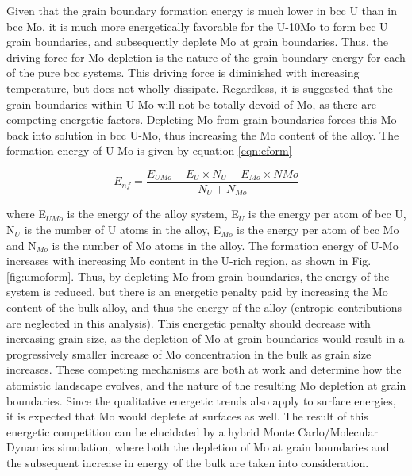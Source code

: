 \documentclass[review]{elsarticle}
\begin{document}
Given that the grain boundary formation energy is much lower in bcc U than in bcc Mo, it is much more energetically favorable for the U-10Mo to form bcc U grain boundaries, and subsequently deplete Mo at grain boundaries. Thus, the driving force for Mo depletion is the nature of the grain boundary energy for each of the pure bcc systems. This driving force is diminished with increasing temperature, but does not wholly dissipate. Regardless, it is suggested that the grain boundaries within U-Mo will not be totally devoid of Mo, as there are competing energetic factors. Depleting Mo from grain boundaries forces this Mo back into solution in bcc U-Mo, thus increasing the Mo content of the alloy. The formation energy of U-Mo is given by equation \ref{eqn:eform}

\begin{equation}
\label{eqn:eform}
E_{nf}= \frac{ E_{UMo} - E_{U} \times N_{U} - E_{Mo} \times N{Mo} }{ N_{U} + N_{Mo} }
\end{equation}

where E$_{UMo}$ is the energy of the alloy system, E$_{U}$ is the energy per atom of bcc U, N$_{U}$ is the number of U atoms in the alloy, E$_{Mo}$ is the energy per atom of bcc Mo and N$_{Mo}$ is the number of Mo atoms in the alloy. The formation energy of U-Mo increases with increasing Mo content in the U-rich region, as shown in Fig. \ref{fig:umoform}. Thus, by depleting Mo from grain boundaries, the energy of the system is reduced, but there is an energetic penalty paid by increasing the Mo content of the bulk alloy, and thus the energy of the alloy (entropic contributions are neglected in this analysis). This energetic penalty should decrease with increasing grain size, as the depletion of Mo at grain boundaries would result in a progressively smaller increase of Mo concentration in the bulk as grain size increases. These competing mechanisms are both at work and determine how the atomistic landscape evolves, and the nature of the resulting Mo depletion at grain boundaries. Since the qualitative energetic trends also apply to surface energies, it is expected that Mo would deplete at surfaces as well. The result of this energetic competition can be elucidated by a hybrid Monte Carlo/Molecular Dynamics simulation, where both the depletion of Mo at grain boundaries and the subsequent increase in energy of the bulk are taken into consideration.
\end{document}
